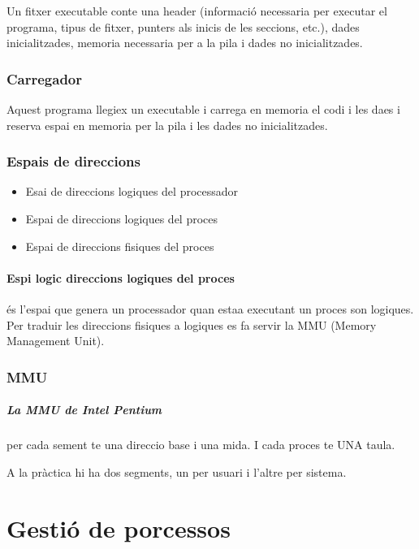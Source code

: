 \documentclass{article}
\begin{document}
        Un fitxer executable conte una header (informació necessaria per executar el programa, tipus de fitxer, punters als inicis de les seccions, etc.), dades inicialitzades, memoria necessaria per a la pila i dades no inicialitzades.

        \subsubsection{Carregador}

            Aquest programa llegiex un executable i carrega en memoria el codi i les daes i reserva espai en memoria per la pila i les dades no inicialitzades.

        \subsubsection{Espais de direccions}

            \begin{itemize}
                \item Esai de direccions logiques del processador
                \item Espai de direccions logiques del proces
                \item Espai de direccions fisiques del proces
            \end{itemize}

        \paragraph{Espi logic direccions logiques del proces}
        és l'espai que genera un processador quan estaa executant un proces son logiques. Per traduir les direccions fisiques a logiques es fa servir la MMU (Memory Management Unit).

        \subsubsection{MMU}

        \subparagraph{La MMU de Intel Pentium}
        per cada sement te una direccio base i una mida. I cada proces te UNA taula.

        A la pràctica hi ha dos segments, un per usuari i l'altre per sistema.

    \pagebreak

    \section{Gestió de porcessos}
\end{document}
